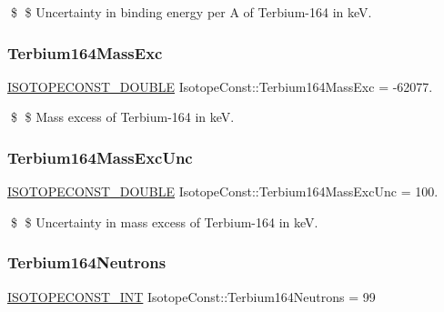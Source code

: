 \$ \$ Uncertainty in binding energy per A of Terbium-\/164 in keV. \mbox{\label{group___isotope_const-_terbium-_tb164_ga96b0805faa79a9b6fb068d0198a4368a}} 
\subsubsection{\texorpdfstring{Terbium164\+Mass\+Exc}{Terbium164MassExc}}
{\footnotesize\ttfamily \mbox{\hyperlink{group___isotope_const-_macros_ga8f45a7272ce02c0b4c65c44636ed719a}{I\+S\+O\+T\+O\+P\+E\+C\+O\+N\+S\+T\+\_\+\+D\+O\+U\+B\+LE}} Isotope\+Const\+::\+Terbium164\+Mass\+Exc = -\/62077.}

\$ \$ Mass excess of Terbium-\/164 in keV. \mbox{\label{group___isotope_const-_terbium-_tb164_ga3489d13b1e37b7dca0f5d69a50521ee6}} 
\subsubsection{\texorpdfstring{Terbium164\+Mass\+Exc\+Unc}{Terbium164MassExcUnc}}
{\footnotesize\ttfamily \mbox{\hyperlink{group___isotope_const-_macros_ga8f45a7272ce02c0b4c65c44636ed719a}{I\+S\+O\+T\+O\+P\+E\+C\+O\+N\+S\+T\+\_\+\+D\+O\+U\+B\+LE}} Isotope\+Const\+::\+Terbium164\+Mass\+Exc\+Unc = 100.}

\$ \$ Uncertainty in mass excess of Terbium-\/164 in keV. \mbox{\label{group___isotope_const-_terbium-_tb164_gaaac5300114b835d283e255d804b44bd4}} 
\subsubsection{\texorpdfstring{Terbium164\+Neutrons}{Terbium164Neutrons}}
{\footnotesize\ttfamily \mbox{\hyperlink{group___isotope_const-_macros_ga5f18360b3e99483a35c32d789e62621c}{I\+S\+O\+T\+O\+P\+E\+C\+O\+N\+S\+T\+\_\+\+I\+NT}} Isotope\+Const\+::\+Terbium164\+Neutrons = 99}


